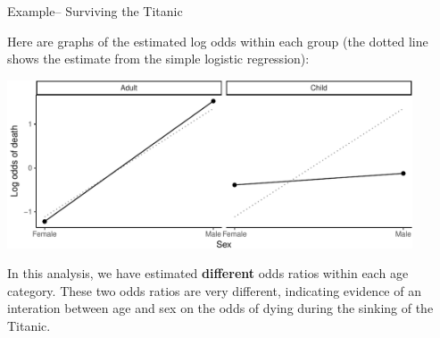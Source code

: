 \documentclass[ignorenonframetext,]{beamer}
\begin{document}
\begin{frame}{Example-- Surviving the Titanic}

Here are graphs of the estimated log odds within each group (the dotted
line shows the estimate from the simple logistic regression):

\vspace{-2mm}

\begin{center}\includegraphics[width=0.9\textwidth]{regression_files/figure-beamer/unnamed-chunk-13-1} \end{center}

\small 

In this analysis, we have estimated \textbf{different} odds ratios
within each age category. These two odds ratios are very different,
indicating evidence of an interation between age and sex on the odds of
dying during the sinking of the Titanic.

\end{frame}
\end{document}
